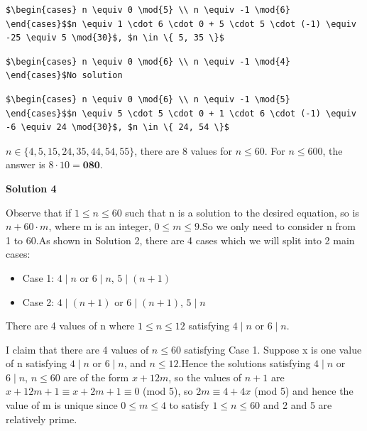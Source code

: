 \begin{enumerate}
\begin{verbatim}
$\begin{cases} n \equiv 0 \mod{5} \\ n \equiv -1 \mod{6} \end{cases}$$n \equiv 1 \cdot 6 \cdot 0 + 5 \cdot 5 \cdot (-1) \equiv -25 \equiv 5 \mod{30}$, $n \in \{ 5, 35 \}$
\end{verbatim}

\begin{verbatim}
$\begin{cases} n \equiv 0 \mod{6} \\ n \equiv -1 \mod{4} \end{cases}$No solution
\end{verbatim}

\begin{verbatim}
$\begin{cases} n \equiv 0 \mod{6} \\ n \equiv -1 \mod{5} \end{cases}$$n \equiv 5 \cdot 5 \cdot 0 + 1 \cdot 6 \cdot (-1) \equiv -6 \equiv 24 \mod{30}$, $n \in \{ 24, 54 \}$
\end{verbatim}

$n \in \{ 4, 5, 15, 24, 35, 44, 54, 55 \}$, there are $8$ values for $n \le 60$. For $n \le 600$, the answer is $8 \cdot 10 = \boxed{\textbf{080}}$.

 



\textbf{Solution 4}

Observe that if $1 \le n \le 60$ such that n is a solution to the desired equation, so is $n + 60\cdot m$, where m is an integer, $0 \le m \le 9$.So we only need to consider n from 1 to 60.As shown in Solution 2, there are 4 cases which we will split into 2 main cases:

 
            \begin{itemize}
        \item Case 1: $4 \mid n$ or $6 \mid n$, $5 \mid (n+1)$
        \item Case 2: $4 \mid (n+1)$ or $6 \mid (n+1)$, $5 \mid n$
            \end{itemize}
            There are 4 values of n where $1 \le n \le 12$ satisfying $4 \mid n$ or $6 \mid n$.

 I claim that there are 4 values of $n \le 60$ satisfying Case 1. Suppose x is one value of n satisfying $4 \mid n$ or $6 \mid n$, and $n \le 12$.Hence the solutions satisfying $4 \mid n$ or $6 \mid n$, $n \le 60$ are of the form $x + 12m$, so the values of $n + 1$ are $x + 12m + 1 \equiv x + 2m + 1 \equiv 0$ (mod 5), so $2m \equiv 4 + 4x$ (mod 5) and hence the value of m is unique since $0 \le m \le 4$ to satisfy $1 \le n \le 60$ and 2 and 5 are relatively prime.


\end{enumerate}
